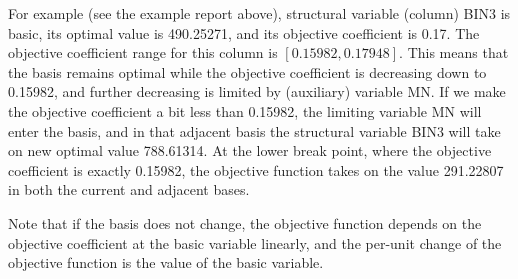 For example (see the example report above), structural variable
(column) BIN3 is basic, its optimal value is 490.25271, and its
objective coefficient is 0.17. The objective coefficient range for this
column is $[0.15982,0.17948]$. This means that the basis remains
optimal while the objective coefficient is decreasing down to 0.15982,
and further decreasing is limited by (auxiliary) variable MN. If we
make the objective coefficient a bit less than 0.15982, the limiting
variable MN will enter the basis, and in that adjacent basis the
structural variable BIN3 will take on new optimal value 788.61314. At
the lower break point, where the objective coefficient is exactly
0.15982, the objective function takes on the value 291.22807 in both
the current and adjacent bases.

Note that if the basis does not change, the objective function depends
on the objective coefficient at the basic variable linearly, and the
per-unit change of the objective function is the value of the basic
variable.

